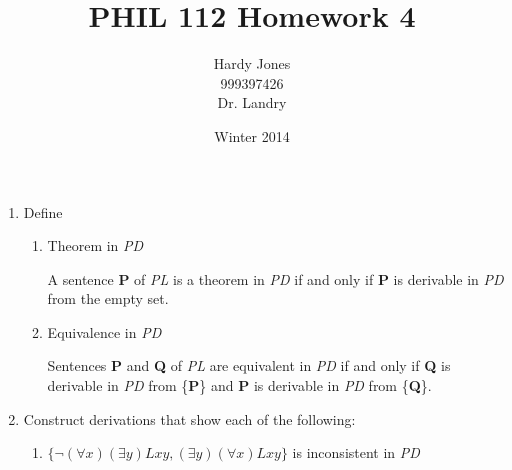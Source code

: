 \documentclass[12pt,letterpaper]{article}
\title{PHIL 112 Homework 4\vspace{-2ex}}
\author{Hardy Jones\\
        999397426\\
        Dr. Landry\vspace{-2ex}}
\date{Winter 2014}
\begin{document}
  \maketitle

  \begin{enumerate}
    \item Define
      \begin{enumerate}
        \item Theorem in \textit{PD}

          A sentence \textbf{P} of \textit{PL} is a theorem in \textit{PD} if and only if
          \textbf{P} is derivable in \textit{PD} from the empty set.

        \item Equivalence in \textit{PD}

          Sentences \textbf{P} and \textbf{Q} of \textit{PL} are equivalent in \textit{PD} if and only if
          \textbf{Q} is derivable in \textit{PD} from \{\textbf{P}\} and
          \textbf{P} is derivable in \textit{PD} from \{\textbf{Q}\}.
      \end{enumerate}

    \item Construct derivations that show each of the following:
      \begin{enumerate}
        \item
          $\{\neg (\forall x)(\exists y)Lxy, (\exists y)(\forall x)Lxy\}$ is inconsistent in \textit{PD}



\end{enumerate}
\end{enumerate}
\end{document}
